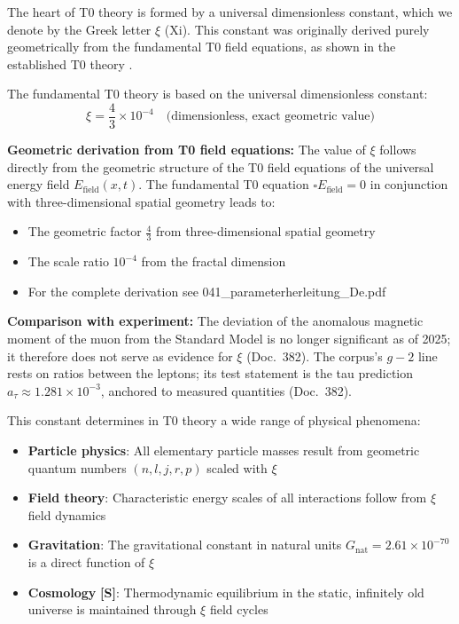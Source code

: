 	The heart of T0 theory is formed by a universal dimensionless constant, which we denote by the Greek letter $\xi$ (Xi). This constant was originally derived purely geometrically from the fundamental T0 field equations, as shown in the established T0 theory \cite{T0Theory}.
	
	The fundamental T0 theory is based on the universal dimensionless constant:
	\begin{equation}
		\xi = \frac{4}{3} \times 10^{-4} \quad \text{(dimensionless, exact geometric value)}
	\end{equation}
	
	\textbf{Geometric derivation from T0 field equations:} The value of $\xi$ follows directly from the geometric structure of the T0 field equations of the universal energy field $E_{\text{field}}(x,t)$. The fundamental T0 equation $\square E_{\text{field}} = 0$ in conjunction with three-dimensional spatial geometry leads to:
\begin{itemize}
	\item The geometric factor $\frac{4}{3}$ from three-dimensional spatial geometry
	\item The scale ratio $10^{-4}$ from the fractal dimension
	\item For the complete derivation see 041\_parameterherleitung\_De.pdf 
\end{itemize}
	
	\textbf{Comparison with experiment:} The deviation of the anomalous magnetic moment of the muon from the Standard Model is no longer significant as of 2025; it therefore does not serve as evidence for $\xi$ (Doc.~382). The corpus's $g-2$ line rests on ratios between the leptons; its test statement is the tau prediction $a_\tau \approx 1.281\times10^{-3}$, anchored to measured quantities (Doc.~382).
	
	This constant determines in T0 theory a wide range of physical phenomena:
	\begin{itemize}
		\item \textbf{Particle physics}: All elementary particle masses result from geometric quantum numbers $(n,l,j,r,p)$ scaled with $\xi$
		\item \textbf{Field theory}: Characteristic energy scales of all interactions follow from $\xi$ field dynamics
		\item \textbf{Gravitation}: The gravitational constant in natural units $G_{\text{nat}} = 2.61 \times 10^{-70}$ is a direct function of $\xi$
		\item \textbf{Cosmology} \textbf{[S]}: Thermodynamic equilibrium in the static, infinitely old universe is maintained through $\xi$ field cycles
	\end{itemize}
	
